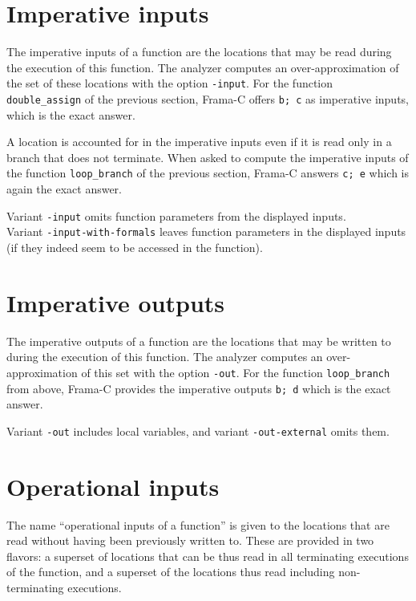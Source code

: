 \documentclass[web]{frama-c-book}
\begin{document}
\section{Imperative inputs}

The imperative inputs of a function are the locations that
may be read during the execution of this function. The analyzer
computes an over-approximation of the set of these locations
with the option \verb|-input|. For the function \lstinline|double_assign|
of the previous section, Frama-C offers \lstinline|b; c|
as imperative inputs, which is the exact answer.

A location is accounted for in the imperative inputs even if
it is read only in a branch that does not terminate.
When asked to compute the imperative inputs of the function
\lstinline|loop_branch| of the previous section, Frama-C answers
\lstinline|c; e| which is again the exact answer.

Variant \verb|-input| omits function parameters from the displayed inputs.\\
Variant \verb|-input-with-formals| leaves function parameters in the displayed inputs (if they indeed seem to be accessed in the function).

\section{Imperative outputs}

The imperative outputs of a function are the locations that may
be written to during the execution of this function. The analyzer
computes an over-approximation of this set with the option
\lstinline|-out|. For the function \lstinline|loop_branch| from above,
Frama-C provides the imperative outputs \lstinline|b; d| which is
the exact answer.

Variant \verb|-out| includes local variables, and variant \verb|-out-external| omits them.

\section{Operational inputs}

The name ``operational inputs of a function'' is given to the
locations that are read without having been previously written to.
These are provided in two flavors: a superset of locations that
can be thus read in all terminating executions of the function,
and a superset of the locations thus read including non-terminating
executions.
\end{document}
